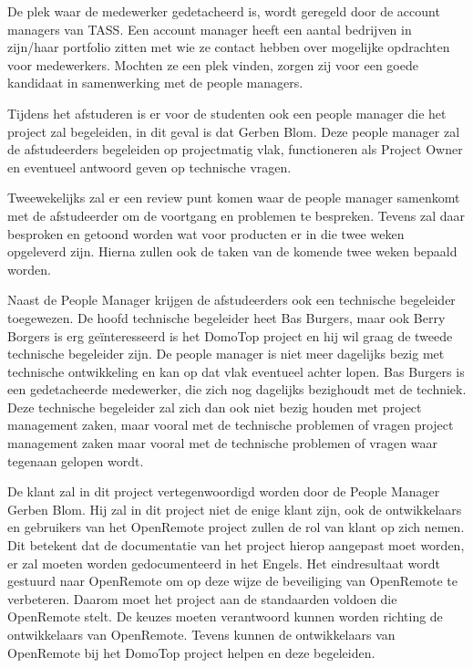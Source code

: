 \documentclass[]{article}
\begin{document}
De plek waar de medewerker gedetacheerd is, wordt geregeld door de account
managers van TASS. Een account manager heeft een aantal bedrijven in
zijn/haar portfolio zitten met wie ze contact hebben over mogelijke
opdrachten voor medewerkers. Mochten ze een plek vinden, zorgen zij voor
een goede kandidaat in samenwerking met de people managers.

Tijdens het afstuderen is er voor de studenten ook een people manager
die het project zal begeleiden, in dit geval is dat Gerben Blom. Deze
people manager zal de afstudeerders begeleiden op projectmatig vlak,
functioneren als Project Owner en eventueel antwoord geven op technische
vragen.

Tweewekelijks zal er een review punt komen waar de people manager
samenkomt met de afstudeerder om de voortgang en problemen te bespreken.
Tevens zal daar besproken en getoond worden wat voor producten er in die twee weken
opgeleverd zijn. Hierna zullen ook de taken van de komende twee weken
bepaald worden.

Naast de People Manager krijgen de afstudeerders ook een technische
begeleider toegewezen. De hoofd technische begeleider heet Bas Burgers,
maar ook Berry Borgers is erg ge\"interesseerd is het DomoTop project en hij
wil graag de tweede technische begeleider zijn. De people manager is
niet meer dagelijks bezig met technische ontwikkeling en kan op dat vlak
eventueel achter lopen. Bas Burgers is een gedetacheerde medewerker, die zich nog
dagelijks bezighoudt met de techniek.
Deze technische begeleider zal zich dan ook niet bezig houden met 
project management zaken, maar vooral met de technische problemen of vragen
project management zaken maar vooral met de technische problemen of vragen
waar tegenaan gelopen wordt.

De klant zal in dit project vertegenwoordigd worden door de People Manager
Gerben Blom. Hij zal in dit project niet de enige klant zijn, ook de
ontwikkelaars en gebruikers van het OpenRemote project zullen de rol van klant
op zich nemen. Dit betekent dat de documentatie van het project hierop aangepast
moet worden, er zal moeten worden gedocumenteerd in het Engels.  
Het eindresultaat wordt gestuurd naar OpenRemote om op deze wijze de beveiliging
van OpenRemote te verbeteren. Daarom moet het project aan de standaarden voldoen die OpenRemote stelt. 
De keuzes moeten verantwoord kunnen worden richting de ontwikkelaars van
OpenRemote. Tevens kunnen de ontwikkelaars van OpenRemote bij het DomoTop project helpen en deze begeleiden.
\end{document}
